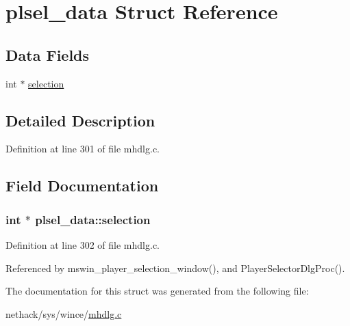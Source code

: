 \hypertarget{structplsel__data}{\section{plsel\+\_\+data Struct Reference}
\label{structplsel__data}
}
\subsection*{Data Fields}
\begin{DoxyCompactItemize}
\item 
int $\ast$ \hyperlink{structplsel__data_a6300c44105a90c7875e99c2b65f56375}{selection}
\end{DoxyCompactItemize}


\subsection{Detailed Description}


Definition at line 301 of file mhdlg.\+c.



\subsection{Field Documentation}
\hypertarget{structplsel__data_a6300c44105a90c7875e99c2b65f56375}{
\subsubsection[{selection}]{\setlength{\rightskip}{0pt plus 5cm}int $\ast$ plsel\+\_\+data\+::selection}}\label{structplsel__data_a6300c44105a90c7875e99c2b65f56375}


Definition at line 302 of file mhdlg.\+c.



Referenced by mswin\+\_\+player\+\_\+selection\+\_\+window(), and Player\+Selector\+Dlg\+Proc().



The documentation for this struct was generated from the following file\+:\begin{DoxyCompactItemize}
\item 
nethack/sys/wince/\hyperlink{sys_2wince_2mhdlg_8c}{mhdlg.\+c}\end{DoxyCompactItemize}
